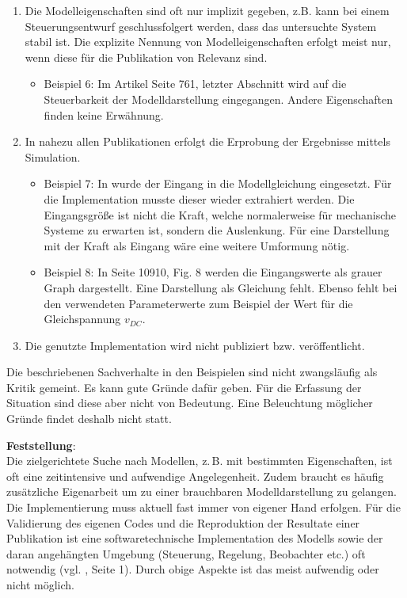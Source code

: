 \begin{enumerate}
\begin{itemize}[label=$\bullet$]
	\end{itemize}
	\item  Die Modelleigenschaften sind oft nur implizit gegeben, z.B. kann bei einem Steuerungsentwurf geschlussfolgert werden, dass das untersuchte System stabil ist. Die explizite Nennung von Modelleigenschaften erfolgt meist nur, wenn diese für die Publikation von Relevanz sind. 
	\begin{itemize}[label=$\bullet$]
		\item Beispiel 6: Im Artikel \cite{PEGUEA16} Seite 761, letzter Abschnitt wird auf die Steuerbarkeit der Modelldarstellung eingegangen. Andere Eigenschaften finden keine Erwähnung.
	\end{itemize}
	\item In nahezu allen Publikationen erfolgt die Erprobung der Ergebnisse mittels Simulation. 
	\begin{itemize}[label=$\bullet$]
		\item Beispiel 7: In \cite{BUT21} wurde der Eingang in die Modellgleichung eingesetzt. Für die Implementation musste dieser wieder extrahiert werden. Die Eingangsgröße ist nicht die Kraft, welche normalerweise für mechanische Systeme zu erwarten ist, sondern die Auslenkung. Für eine Darstellung mit der Kraft als Eingang wäre eine weitere Umformung nötig.
		\item Beispiel 8: In \cite{FEGE18} Seite 10910, Fig. 8 werden die Eingangswerte als grauer Graph dargestellt. Eine Darstellung als Gleichung fehlt. Ebenso fehlt bei den verwendeten Parameterwerte zum Beispiel der Wert für die Gleichspannung $v_{DC}$.
	\end{itemize}
	\item Die genutzte Implementation wird nicht publiziert bzw. veröffentlicht.
\end{enumerate}
Die beschriebenen Sachverhalte in den Beispielen sind nicht zwangsläufig als Kritik gemeint. Es kann gute Gründe dafür geben. Für die Erfassung der Situation sind diese aber nicht von Bedeutung. Eine Beleuchtung möglicher Gründe findet deshalb nicht statt.

\textbf{Feststellung}:\\
Die zielgerichtete Suche nach Modellen, z.\,B. mit bestimmten Eigenschaften, ist oft eine zeitintensive und aufwendige Angelegenheit. Zudem braucht es häufig zusätzliche Eigenarbeit um zu einer brauchbaren Modelldarstellung zu gelangen. Die Implementierung muss aktuell fast immer von eigener Hand erfolgen. Für die Validierung des eigenen Codes und die Reproduktion der Resultate einer Publikation ist eine softwaretechnische Implementation des Modells sowie der daran angehängten Umgebung (Steuerung, Regelung, Beobachter etc.) oft notwendig (vgl. \cite{KNHE20b}, Seite 1). Durch obige Aspekte ist das meist aufwendig oder nicht möglich.

